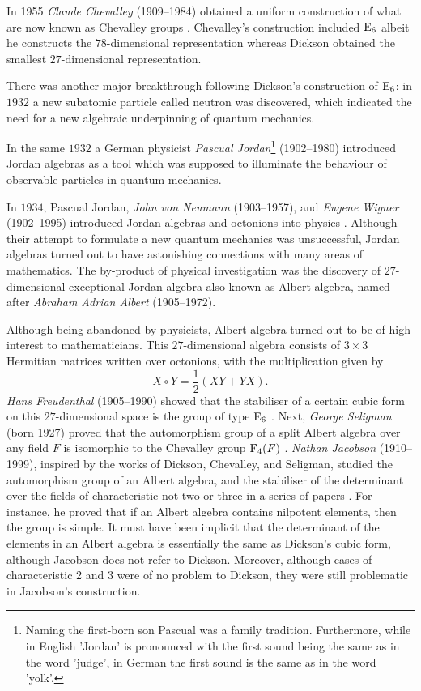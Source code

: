 In 1955 \textit{Claude Chevalley} (1909--1984) obtained a uniform
construction of what are now known as Chevalley groups 
\cite{Chevalley}. Chevalley's construction included $\mathrm{E}_6$ albeit
he constructs the $78$-dimensional representation whereas
Dickson obtained the smallest $27$-dimensional representation. 

There was another major breakthrough following Dickson's 
construction of $\mathrm{E}_6$: in $1932$ a new subatomic particle called
neutron was discovered, which indicated the need for a new 
algebraic underpinning of quantum mechanics.

In the same $1932$ a German physicist 
\textit{Pascual Jordan}\footnote{
Naming the first-born son Pascual was a family tradition. 
Furthermore, while in English 'Jordan' is pronounced with the
first sound being the same as in the word 'judge', in German
the first sound is the same as in the word 'yolk'.
} (1902--1980) introduced Jordan algebras as a tool which was 
supposed to illuminate the behaviour of observable particles 
in quantum mechanics. 

In $1934$, Pascual Jordan, \textit{John von Neumann} (1903--1957), 
and \textit{Eugene Wigner} (1902--1995) introduced Jordan 
algebras and octonions into physics \cite{JordanNeumannWigner}. 
Although their attempt to formulate a new quantum mechanics was
unsuccessful, Jordan algebras turned out to have astonishing 
connections with many areas of mathematics. The by-product of
physical investigation was the discovery of $27$-dimensional
exceptional Jordan algebra also known as Albert algebra, named 
after \textit{Abraham Adrian Albert} (1905--1972).

Although being abandoned by physicists, Albert algebra turned out
to be of high interest to mathematicians. This $27$-dimensional
algebra consists of $3\times 3$ Hermitian matrices written 
over octonions, with the multiplication given by
\begin{equation}
X\circ Y = \frac12 (XY + YX).	
\end{equation}
\textit{Hans Freudenthal} (1905--1990) showed that the stabiliser
of a certain cubic form on this $27$-dimensional space is the 
group of type $\mathrm{E}_6$ \cite{Freudenthal}. Next, 
\textit{George Seligman} (born 1927) proved that the 
automorphism group of a split Albert algebra over any field
$F$ is isomorphic to the Chevalley group $\mathrm{F}_4(F)$ 
\cite{Seligman}. \textit{Nathan Jacobson} (1910--1999), 
inspired by the works of Dickson,
Chevalley, and Seligman, studied the automorphism group of an
Albert algebra, and the stabiliser of the determinant over the
fields of characteristic not two or three in a series of papers
\cite{JacobsonOne,JacobsonTwo,JacobsonThree}. For instance, he 
proved that if an Albert algebra contains nilpotent elements, 
then the group is simple. It must have been implicit that the
determinant of the elements in an Albert algebra is essentially
the same as Dickson's cubic form, although Jacobson does not refer
to Dickson. Moreover, although cases of characteristic 2 and 3
were of no problem to Dickson, they were still problematic in
Jacobson's construction.

